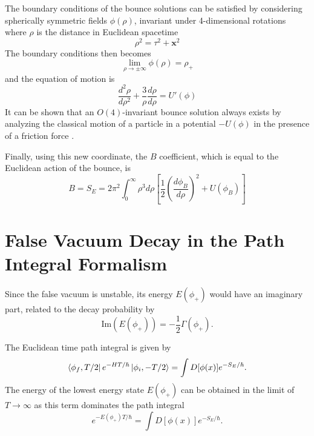\documentclass[a0,portrait]{a0poster}
\begin{document}
\begin{multicols}{3}
The boundary conditions of the bounce solutions can be satisfied by considering spherically symmetric fields $\phi(\rho)$, invariant under 4-dimensional rotations where $\rho$ is the distance in Euclidean spacetime
\begin{equation}
\rho^2 = \tau^2 + \mathbf{x}^2
\end{equation}
The boundary conditions then becomes
\begin{equation}
\lim_{\rho \rightarrow \pm \infty} \phi(\rho) = \rho_+ 
\end{equation}
and the equation of motion is
\begin{equation}
\frac{d^2 \rho}{d\rho^2} + \frac{3}{\rho}\frac{d \rho}{d\rho} = U'(\phi)
\end{equation}
It can be shown that an $O(4)$-invariant  bounce solution always exists by analyzing the classical motion of a particle in a potential $-U(\phi)$ in the presence of a friction force \cite{coleman}. 

Finally, using this new coordinate, the $B$ coefficient, which is equal to the Euclidean action of the bounce, is
\begin{equation}
B = S_E = 2\pi^2 \int_0^\infty \rho^3 d\rho \left[ \frac{1}{2} \left(\frac{d\phi_B}{d\rho}\right)^2 + U(\phi_B)\right]
\end{equation}

\section{False Vacuum Decay in the Path Integral Formalism}

Since the false vacuum is unstable, its energy $E(\phi_+)$ would have an imaginary part, related to the decay probability by \cite{rubakov}
\begin{equation}
\mathrm{Im}(E(\phi_+)) = - \frac{1}{2}\Gamma(\phi_+).
\end{equation}

The Euclidean time path integral is given by
\begin{equation}
\bra{\phi_f, T/2} e^{-HT/\hbar} \ket{\phi_i, -T/2} = \int D[\phi(x)] e^{-S_E/\hbar}.
\end{equation}
The energy of the lowest energy state $E(\phi_+)$ can be obtained in the limit of $T \rightarrow \infty$ as this term dominates the path integral
\begin{equation}
e^{-E(\phi_+)T/\hbar} = \int D[\phi(x)] e^{-S_E/\hbar}.
\end{equation}


\end{multicols}
\end{document}
